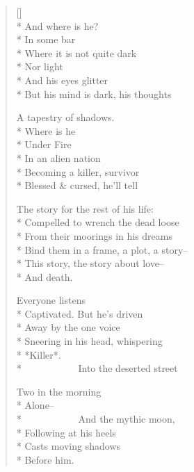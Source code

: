 \label{ch:under_fire}
\settowidth{\versewidth}{Bind them in a frame, a plot, a story--}
\begin{verse}[\versewidth]
 \\*
And where is he?\\*
In some bar\\*
Where it is not quite dark\\*
Nor light\\*
And his eyes glitter\\*
But his mind is dark, his thoughts

A tapestry of shadows.\\*
Where is he\\*
Under Fire\\*
In an alien nation\\*
Becoming a killer, survivor\\*
Blessed \& cursed, he'll tell

The story for the rest of his life:\\*
Compelled to wrench the dead loose\\*
From their moorings in his dreams\\*
Bind them in a frame, a plot, a story--\\*
This story, the story about love--\\*
And death.

Everyone listens\\*
Captivated. But he's driven\\*
Away by the one voice\\*
Sneering in his head, whispering\\*
*Killer*.\\*
             Into the deserted street

Two in the morning\\*
Alone--\\*
             And the mythic moon,\\*
Following at his heels\\*
Casts moving shadows\\*
Before him.
\end{verse}
